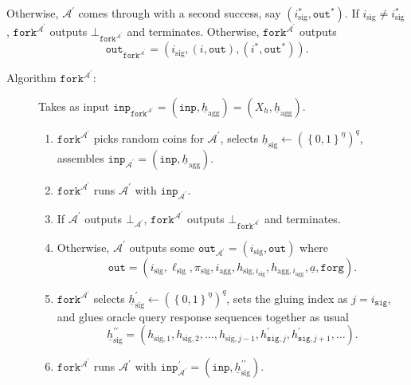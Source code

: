 \documentclass{mrl}
\theoremstyle{definition}
\numberwithin{theorem}{subsection}
\newcommand{\adversary}{\mathcal{A}}
\begin{document}
Otherwise, $\adversary^{\prime}$ comes through with a second success, say $(i_{\text{sig}}^*, \texttt{out}^*)$. If $i_{\text{sig}} \neq i_{\text{sig}}^*$, $\texttt{fork}^{\adversary^\prime}$ outputs $\bot_{\texttt{fork}^{\adversary^\prime}}$ and terminates. Otherwise, $\texttt{fork}^{\adversary^\prime}$ outputs \[\texttt{out}_{\texttt{fork}^{\adversary^\prime}} = (i_{\text{sig}}, (i, \texttt{out}), (i^*, \texttt{out}^*)).\]

\begin{description}

\item [Algorithm $\texttt{fork}^{\adversary^\prime}$:] Takes as input $\texttt{inp}_{\texttt{fork}^{\adversary^\prime}} = (\texttt{inp}, \underline{h}_{\text{agg}}) = (X_h, \underline{h}_{\text{agg}})$. 
\begin{enumerate}
\item $\texttt{fork}^{\adversary^\prime}$ picks random coins for $\adversary^\prime$, selects $\underline{h}_{\text{sig}} \leftarrow (\left\{0,1\right\}^{\eta})^q$,  assembles  $\texttt{inp}_{\adversary^\prime} = (\texttt{inp}, \underline{h}_{\text{agg}})$.

\item $\texttt{fork}^{\adversary^\prime}$ runs $\adversary^\prime$ with $\texttt{inp}_{\adversary^\prime}$.

\item If $\adversary^\prime$ outputs $\bot_{\adversary^\prime}$, $\texttt{fork}^{\adversary^\prime}$ outputs $\bot_{\texttt{fork}^{\adversary^\prime}}$ and terminates.

\item Otherwise, $\adversary^\prime$ outputs some $\texttt{out}_{\adversary^\prime} = (i_{\text{sig}}, \texttt{out})$ where \[\texttt{out} = (i_{\text{sig}}, \ell_{\text{sig}}, \pi_{\text{sig}}, i_{\text{agg}}, h_{\text{sig}, i_{\text{sig}}}, h_{\text{agg}, i_{\text{agg}}}, \underline{a}, \texttt{forg}).\]

\item $\texttt{fork}^{\adversary^\prime}$ selects $\underline{h}_{\text{sig}}^{\prime} \leftarrow (\left\{0,1\right\}^\eta)^q$, sets the gluing index as $j = i_{\texttt{sig}}$, and glues oracle query response sequences together as usual \[\underline{h}_{\text{sig}}^{\prime \prime}= (h_{\text{sig},1}, h_{\text{sig},2}, \ldots, h_{\text{sig}, j - 1}, h^{\prime}_{\texttt{sig}, j}, h^{\prime}_{\texttt{sig}, j+1}, \ldots).\]

\item $\texttt{fork}^{\adversary^\prime}$ runs $\adversary^\prime$ with $\texttt{inp}^{\prime}_{\adversary^\prime} = (\texttt{inp}, \underline{h}_{\text{sig}}^{\prime \prime})$.




\end{enumerate}
\end{description}
\end{document}
